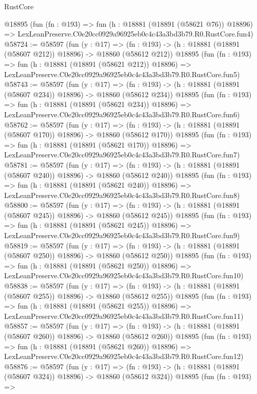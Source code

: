 \begin{lexlean}{RustCore}
\begin{coremodule}
    @18895
    (fun (fn : @193) =>
    fun (h : @18881 (@18891 (@58621 @76)) @18896) =>
    LexLeanPreserve.C0e20cc0929a96925eb0c4c43a3bd3b79.R0.RustCore.fun4)
@58724 := @58597
    (fun (y : @17) =>
    (fn : @193) -> (h : @18881 (@18891 (@58607 @212)) @18896) -> @18860 (@58612 @212))
    @18895
    (fun (fn : @193) =>
    fun (h : @18881 (@18891 (@58621 @212)) @18896) =>
    LexLeanPreserve.C0e20cc0929a96925eb0c4c43a3bd3b79.R0.RustCore.fun5)
@58743 := @58597
    (fun (y : @17) =>
    (fn : @193) -> (h : @18881 (@18891 (@58607 @234)) @18896) -> @18860 (@58612 @234))
    @18895
    (fun (fn : @193) =>
    fun (h : @18881 (@18891 (@58621 @234)) @18896) =>
    LexLeanPreserve.C0e20cc0929a96925eb0c4c43a3bd3b79.R0.RustCore.fun6)
@58762 := @58597
    (fun (y : @17) =>
    (fn : @193) -> (h : @18881 (@18891 (@58607 @170)) @18896) -> @18860 (@58612 @170))
    @18895
    (fun (fn : @193) =>
    fun (h : @18881 (@18891 (@58621 @170)) @18896) =>
    LexLeanPreserve.C0e20cc0929a96925eb0c4c43a3bd3b79.R0.RustCore.fun7)
@58781 := @58597
    (fun (y : @17) =>
    (fn : @193) -> (h : @18881 (@18891 (@58607 @240)) @18896) -> @18860 (@58612 @240))
    @18895
    (fun (fn : @193) =>
    fun (h : @18881 (@18891 (@58621 @240)) @18896) =>
    LexLeanPreserve.C0e20cc0929a96925eb0c4c43a3bd3b79.R0.RustCore.fun8)
@58800 := @58597
    (fun (y : @17) =>
    (fn : @193) -> (h : @18881 (@18891 (@58607 @245)) @18896) -> @18860 (@58612 @245))
    @18895
    (fun (fn : @193) =>
    fun (h : @18881 (@18891 (@58621 @245)) @18896) =>
    LexLeanPreserve.C0e20cc0929a96925eb0c4c43a3bd3b79.R0.RustCore.fun9)
@58819 := @58597
    (fun (y : @17) =>
    (fn : @193) -> (h : @18881 (@18891 (@58607 @250)) @18896) -> @18860 (@58612 @250))
    @18895
    (fun (fn : @193) =>
    fun (h : @18881 (@18891 (@58621 @250)) @18896) =>
    LexLeanPreserve.C0e20cc0929a96925eb0c4c43a3bd3b79.R0.RustCore.fun10)
@58838 := @58597
    (fun (y : @17) =>
    (fn : @193) -> (h : @18881 (@18891 (@58607 @255)) @18896) -> @18860 (@58612 @255))
    @18895
    (fun (fn : @193) =>
    fun (h : @18881 (@18891 (@58621 @255)) @18896) =>
    LexLeanPreserve.C0e20cc0929a96925eb0c4c43a3bd3b79.R0.RustCore.fun11)
@58857 := @58597
    (fun (y : @17) =>
    (fn : @193) -> (h : @18881 (@18891 (@58607 @260)) @18896) -> @18860 (@58612 @260))
    @18895
    (fun (fn : @193) =>
    fun (h : @18881 (@18891 (@58621 @260)) @18896) =>
    LexLeanPreserve.C0e20cc0929a96925eb0c4c43a3bd3b79.R0.RustCore.fun12)
@58876 := @58597
    (fun (y : @17) =>
    (fn : @193) -> (h : @18881 (@18891 (@58607 @324)) @18896) -> @18860 (@58612 @324))
    @18895
    (fun (fn : @193) =>

\end{coremodule}
\end{lexlean}
